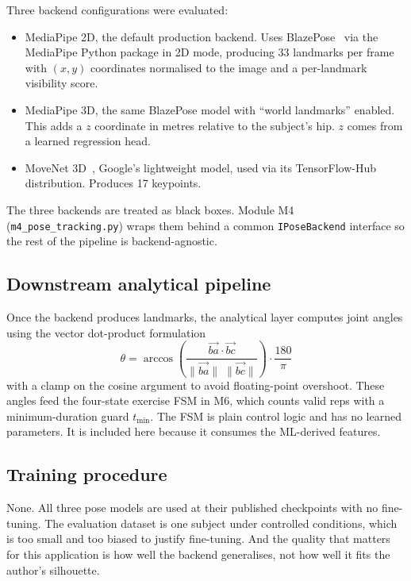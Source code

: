 \documentclass[11pt]{article}
\begin{document}
Three backend configurations were evaluated:

\begin{itemize}
  \item MediaPipe 2D, the default production backend. Uses
    BlazePose~\citep{Bazarevsky2020BlazePose} via the MediaPipe Python
    package in 2D mode, producing 33 landmarks per frame with $(x,y)$
    coordinates normalised to the image and a per-landmark visibility
    score.
  \item MediaPipe 3D, the same BlazePose model with ``world
    landmarks'' enabled. This adds a $z$ coordinate in metres
    relative to the subject's hip. $z$ comes from a learned
    regression head.
  \item MoveNet 3D~\citep{MoveNet2021}, Google's lightweight model,
    used via its TensorFlow-Hub distribution. Produces 17 keypoints.
\end{itemize}

The three backends are treated as black boxes. Module M4
(\texttt{m4\_pose\_tracking.py}) wraps them behind a common
\texttt{IPoseBackend} interface so the rest of the pipeline is
backend-agnostic.

\subsection{Downstream analytical pipeline}

Once the backend produces landmarks, the analytical layer computes
joint angles using the vector dot-product formulation
\begin{equation}
  \theta = \arccos\!\left(\frac{\overrightarrow{ba}\cdot
  \overrightarrow{bc}}{\|\overrightarrow{ba}\|\;\|\overrightarrow{bc}\|}\right)
  \cdot \frac{180}{\pi}
  \label{eq:angle}
\end{equation}
with a clamp on the cosine argument to avoid floating-point overshoot.
These angles feed the four-state exercise FSM in M6, which counts
valid reps with a minimum-duration guard $t_{\min}$. The FSM is plain
control logic and has no learned parameters. It is included here
because it consumes the ML-derived features.

\subsection{Training procedure}

None. All three pose models are used at their published checkpoints
with no fine-tuning. The evaluation dataset is one subject under
controlled conditions, which is too small and too biased to justify
fine-tuning. And the quality that matters for this application is how
well the backend generalises, not how well it fits the author's
silhouette.
\end{document}
